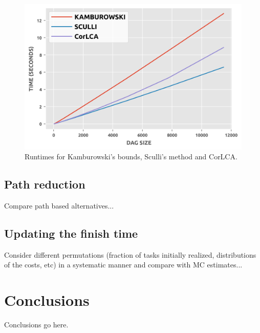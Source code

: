 \documentclass[12pt]{article}
\begin{document}
      \begin{figure}
	\centering	
	\includegraphics[scale=1.0]{existing_timings.png}
	\caption{Runtimes for Kamburowski's bounds, Sculli's method and CorLCA.}	
	\label{plot.existing_timings}
      \end{figure}
 

      

\subsection{Path reduction}
\label{subsect.results_path_reduction}

Compare path based alternatives...

\subsection{Updating the finish time}
\label{subsect.results_updating}

Consider different permutations (fraction of tasks initially realized, distributions of the costs, etc) in a systematic manner and compare with MC estimates... 

\section{Conclusions}
\label{sect.conclusions}

Conclusions go here. 



\end{document}
